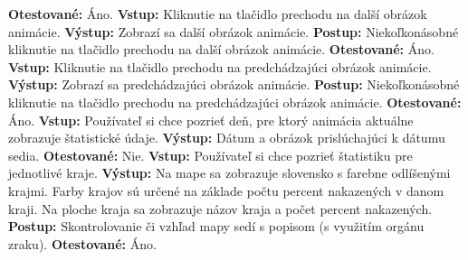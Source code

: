 \documentclass[12pt,a4paper]{report}
\begin{document}
\begin{flushleft}
	\textbf{Otestované:} Áno.\linebreak
	\linebreak
	\textbf{Vstup:} Kliknutie na tlačidlo prechodu na další obrázok animácie.\linebreak
	\textbf{Výstup:} Zobrazí sa další obrázok animácie.\linebreak
	\textbf{Postup:} Niekoľkonásobné kliknutie na tlačidlo prechodu na další obrázok animácie. \linebreak
	\textbf{Otestované:} Áno.\linebreak
	\linebreak
	\textbf{Vstup:} Kliknutie na tlačidlo prechodu na predchádzajúci obrázok animácie.\linebreak
	\textbf{Výstup:} Zobrazí sa predchádzajúci obrázok animácie.\linebreak
	\textbf{Postup:} Niekoľkonásobné kliknutie na tlačidlo prechodu na predchádzajúci obrázok animácie. \linebreak
	\textbf{Otestované:} Áno.\linebreak
	\linebreak
	\textbf{Vstup:} Používateľ si chce pozrieť deň, pre ktorý animácia aktuálne zobrazuje štatistické údaje.\linebreak
	\textbf{Výstup:} Dátum a obrázok prislúchajúci k dátumu sedia.\linebreak
	\textbf{Otestované:} Nie.\linebreak
	\linebreak
	\textbf{Vstup:} Používateľ si chce pozrieť štatistiku pre jednotlivé kraje.\linebreak
	\textbf{Výstup:} Na mape sa zobrazuje slovensko s farebne odlíšenými krajmi. Farby krajov sú určené na základe počtu percent nakazených v danom kraji. Na ploche kraja sa zobrazuje názov kraja a počet percent nakazených.\linebreak
	\textbf{Postup:} Skontrolovanie či vzhľad mapy sedí s popisom (s využitím orgánu zraku). \linebreak
	\textbf{Otestované:} Áno.\linebreak
\end{flushleft}
\end{document}
